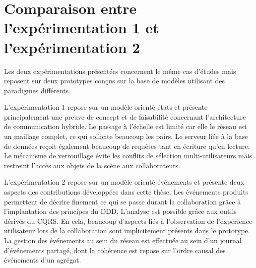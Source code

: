 \section{Comparaison entre l'expérimentation 1 et l'expérimentation 2}

Les deux expérimentations présentées concernent le même cas d'études mais 
reposent sur deux prototypes conçus sur la base de modèles utilisant des 
paradigmes différents. 

L'expérimentation 1 repose sur un modèle orienté états et présente principalement 
une preuve de concept et de faisabilité concernant l'architecture de communication 
hybride. Le passage à l'échelle est limité car elle le réseau est un maillage 
complet, ce qui sollicite beaucoup les pairs. Le serveur liée à la base de données 
reçoit également beaucoup de requêtes tant en écriture qu'en lecture. Le 
mécanisme de verrouillage évite les conflits de sélection multi-utilisateurs mais 
restreint l'accès aux objets de la scène aux collaborateurs. 


L'expérimentation 2 repose sur un modèle orienté événements et présente deux 
aspects des contributions développées dans cette thèse. Les événements 
produits permettent de décrire finement ce qui se passe durant la 
collaboration grâce à l'implantation des principes du \gls{DDD}. L'analyse est 
possible grâce aux outils dérivés du \gls{CQRS}. En cela, beaucoup d'aspects liés 
à l'observation de l'expérience utilisateur lors de la collaboration sont implicitement 
présents dans le prototype. La gestion des événements au sein du réseau est 
effectuée au sein d'un journal d'événements 
partagé, dont la cohérence est repose sur l'ordre causal des événements d'un 
agrégat.


